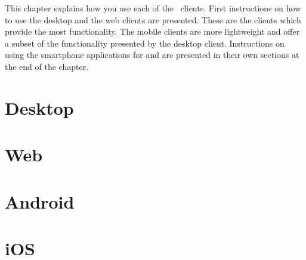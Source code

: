 

This chapter explains how you use each of the \appName\ clients. First instructions on how to use the desktop and the web clients are presented. These are the clients which provide the most functionality. The mobile clients are more lightweight and offer a subset of the functionality presented by the desktop client. Instructions on using the smartphone applications for  and  are presented in their own sections at the end of the chapter. 


\section{Desktop}

\FloatBarrier

\section{Web}

\FloatBarrier

\section{Android}


\FloatBarrier

\section{iOS}


\FloatBarrier
